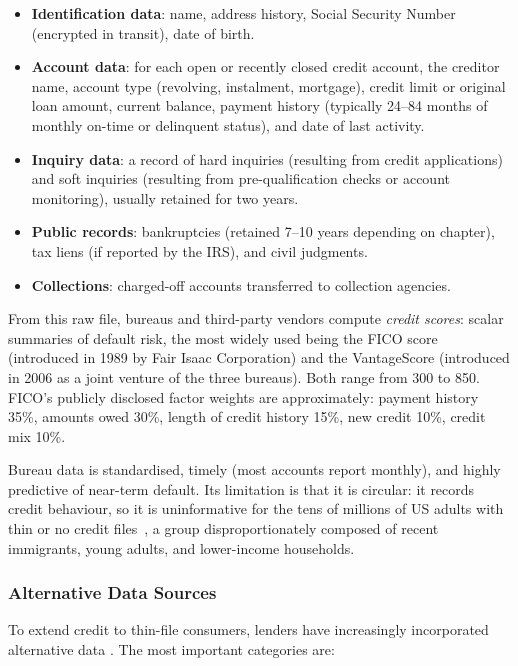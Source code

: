 \begin{context}
\begin{itemize}
  \item \textbf{Identification data}: name, address history, Social Security Number (encrypted in transit), date of birth.
  \item \textbf{Account data}: for each open or recently closed credit account, the creditor name, account type (revolving, instalment, mortgage), credit limit or original loan amount, current balance, payment history (typically 24--84 months of monthly on-time or delinquent status), and date of last activity.
  \item \textbf{Inquiry data}: a record of hard inquiries (resulting from credit applications) and soft inquiries (resulting from pre-qualification checks or account monitoring), usually retained for two years.
  \item \textbf{Public records}: bankruptcies (retained 7--10 years depending on chapter), tax liens (if reported by the IRS), and civil judgments.
  \item \textbf{Collections}: charged-off accounts transferred to collection agencies.
\end{itemize}

From this raw file, bureaus and third-party vendors compute \emph{credit scores}: scalar summaries of default risk, the most widely used being the FICO score (introduced in 1989 by Fair Isaac Corporation) and the VantageScore (introduced in 2006 as a joint venture of the three bureaus). Both range from 300 to 850. FICO's publicly disclosed factor weights are approximately: payment history 35\%, amounts owed 30\%, length of credit history 15\%, new credit 10\%, credit mix 10\%.

Bureau data is standardised, timely (most accounts report monthly), and highly predictive of near-term default. Its limitation is that it is circular: it records credit behaviour, so it is uninformative for the tens of millions of US adults with thin or no credit files~\citep{cfpb2013ecoa}, a group disproportionately composed of recent immigrants, young adults, and lower-income households.

\subsubsection*{Alternative Data Sources}

To extend credit to thin-file consumers, lenders have increasingly incorporated alternative data \cite{campbell2006household}. The most important categories are:


\end{context}
